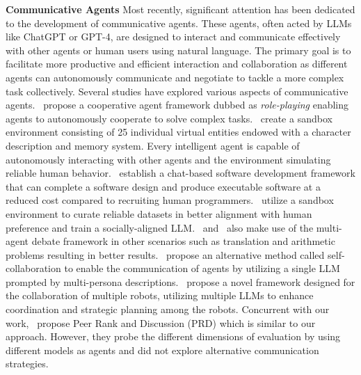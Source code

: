 \textbf{Communicative Agents} Most recently, significant attention has been dedicated to the development of communicative agents. These agents, often acted by LLMs like ChatGPT or GPT-4, are designed to interact and communicate effectively with other agents or human users using natural language. The primary goal is to facilitate more productive and efficient interaction and collaboration as different agents can autonomously communicate and negotiate to tackle a more complex task collectively. Several studies have explored various aspects of communicative agents.~\cite{li2023camel} propose a cooperative agent framework dubbed as \textit{role-playing} enabling agents to autonomously cooperate to solve complex tasks.~\cite{park2023generative} create a sandbox environment consisting of 25 individual virtual entities endowed with a character description and memory system. Every intelligent agent is capable of autonomously interacting with other agents and the environment simulating reliable human behavior.~\cite{qian2023communicative} establish a chat-based software development framework that can complete a software design and produce executable software at a reduced cost compared to recruiting human programmers.~\cite{liu2023training} utilize a sandbox environment to curate reliable datasets in better alignment with human preference and train a socially-aligned LLM.~\cite{liang2023encouraging} and~\cite{du2023improving} also make use of the multi-agent debate framework in other scenarios such as translation and arithmetic problems resulting in better results.~\cite{wang2023unleashing} propose an alternative method called self-collaboration to enable the communication of agents by utilizing a single LLM prompted by multi-persona descriptions.~\cite{mandi2023roco} propose a novel framework designed for the collaboration of multiple robots, utilizing multiple LLMs to enhance coordination and strategic planning among the robots. Concurrent with our work,~\cite{li2023prd} propose Peer Rank and Discussion (PRD) which is similar to our approach. However, they probe the different dimensions of evaluation by using different models as agents and did not explore alternative communication strategies.
